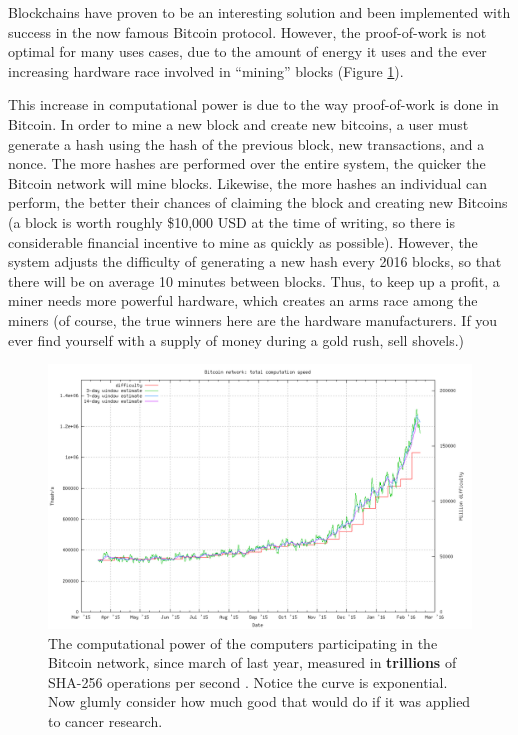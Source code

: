 \documentclass[11pt,letterpaper]{article}
\begin{document}
	
	Blockchains have proven to be an interesting solution and been implemented with success in the now famous Bitcoin protocol.
	However, the proof-of-work is not optimal for many uses cases, due to the amount of energy it uses and the ever increasing hardware race involved in ``mining'' blocks (Figure \ref{fig:speed-lin}).
	
	
	
	This increase in computational power is due to the way proof-of-work is done in Bitcoin.  
	In order to mine a new block and create new bitcoins, a user must generate a hash using the hash of the previous block, new transactions, and a nonce.  
	The more hashes are performed over the entire system,  the quicker the Bitcoin network will mine blocks. 
	Likewise, the more hashes an individual can perform, the better their chances of claiming the block and creating new Bitcoins (a block is worth roughly \$10,000 USD at the time of writing, so there is considerable financial incentive to mine as quickly as possible). 
	However, the system adjusts the difficulty of generating a new hash every 2016 blocks, so that there will be on average 10 minutes between blocks.
	Thus, to keep up a profit, a miner needs more powerful hardware, which creates an arms race among the miners (of course, the true winners here are the hardware manufacturers.  If you ever find yourself with a supply of money during a gold rush, sell shovels.)
	
	\begin{figure}
		\centering
		\includegraphics[width=\linewidth]{figs/speed-lin}
		\caption{The computational power of the computers participating in the Bitcoin network, since march of last year, measured in \textbf{trillions} of SHA-256 operations per second \cite{hashing}.  Notice the curve is exponential.   Now glumly consider how much good that would do if it was applied to cancer research.
		   }
		\label{fig:speed-lin}
	\end{figure}
	
\end{document}
